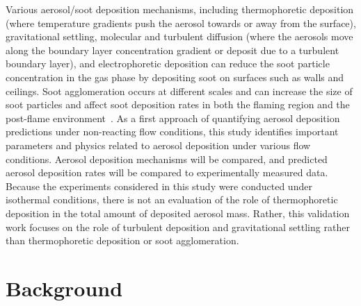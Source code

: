 Various aerosol/soot deposition mechanisms, including thermophoretic deposition (where temperature gradients push the aerosol towards or away from the surface), gravitational settling, molecular and turbulent diffusion (where the aerosols move along the boundary layer concentration gradient or deposit due to a turbulent boundary layer), and electrophoretic deposition can reduce the soot particle concentration in the gas phase by depositing soot on surfaces such as walls and ceilings. Soot agglomeration occurs at different scales and can increase the size of soot particles and affect soot deposition rates in both the flaming region and the post-flame environment~\cite{Butler:2004p433,mulholland1977coagulation}. As a first approach of quantifying aerosol deposition predictions under non-reacting flow conditions, this study identifies important parameters and physics related to aerosol deposition under various flow conditions. Aerosol deposition mechanisms will be compared, and predicted aerosol deposition rates will be compared to experimentally measured data. Because the experiments considered in this study were conducted under isothermal conditions, there is not an evaluation of the role of thermophoretic deposition in the total amount of deposited aerosol mass. Rather, this validation work focuses on the role of turbulent deposition and gravitational settling rather than thermophoretic deposition or soot agglomeration.

\section{Background}
\label{sec:Background}

